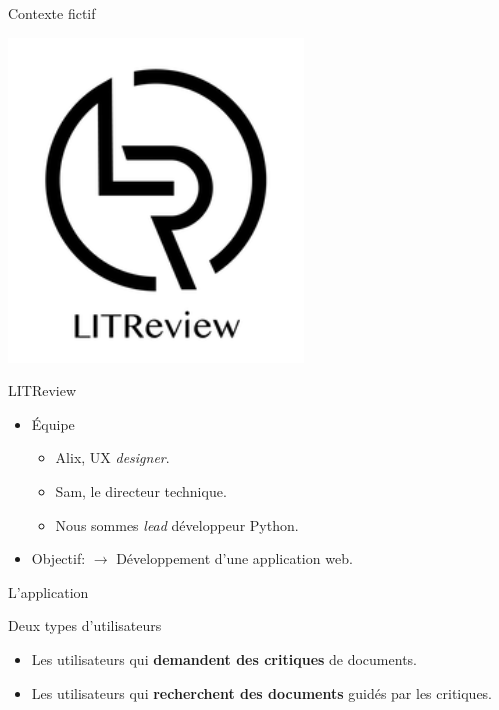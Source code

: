\begin{frame}{Contexte fictif}
  \begin{center}
    \includegraphics[scale=0.2]{img/logo.png}
  \end{center}
  
  \begin{block}{LITReview}
    \begin{itemize}
    \item Équipe
      \begin{itemize}
      \item Alix, UX \textit{designer}.
      \item Sam, le directeur technique.
      \item Nous sommes \textit{lead} développeur Python.
      \end{itemize}
    \item Objectif: $\rightarrow$ Développement d'une application web.
    \end{itemize}    
  \end{block}
\end{frame}

\begin{frame}{L'application}
  \begin{block}{Deux types d'utilisateurs}
    \begin{itemize}
    \item Les utilisateurs qui \textbf{demandent des critiques} de documents.
    \item Les utilisateurs qui \textbf{recherchent des documents} guidés par les critiques.
    \end{itemize}
  \end{block}
\end{frame}
